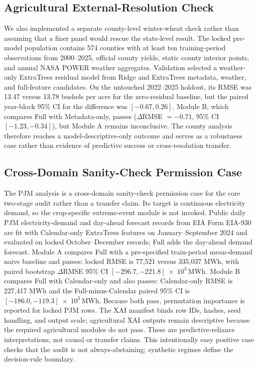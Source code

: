 \documentclass[conference]{IEEEtran}
\begin{document}
\subsection{Agricultural External-Resolution Check}
We also implemented a separate county-level winter-wheat check rather than
assuming that a finer panel would rescue the state-level result. The locked
pre-model population contains 574 counties with at least ten training-period
observations from 2000--2025, official county yields, static county interior
points, and annual NASA POWER weather aggregates. Validation selected a
weather-only ExtraTrees residual model from Ridge and ExtraTrees metadata,
weather, and full-feature candidates. On the untouched 2022--2025 holdout, its
RMSE was 13.47 versus 13.78 bushels per acre for the zero-residual baseline, but
the paired year-block 95\% CI for the difference was $[-0.67,0.26]$. Module B,
which compares Full with Metadata-only, passes ($\Delta$RMSE $=-0.71$, 95\% CI
$[-1.23,-0.34]$), but Module A remains inconclusive. The county analysis therefore
reaches a model-descriptive-only outcome and serves as a robustness case rather
than evidence of predictive success or cross-resolution transfer.

\subsection{Cross-Domain Sanity-Check Permission Case}
The PJM analysis is a cross-domain sanity-check permission case for the core
two-stage audit rather than a transfer claim. Its target is continuous electricity
demand, so the crop-specific extreme-event module is not invoked. Public daily PJM
electricity-demand and day-ahead forecast records from EIA Form EIA-930
\cite{EIA930} are fit with Calendar-only ExtraTrees features on
January--September 2024 and evaluated on locked October--December records; Full
adds the day-ahead demand forecast. Module A compares Full with a pre-specified
train-period mean-demand naive baseline and passes: locked RMSE is 77,521 versus
335,037 MWh, with paired bootstrap $\Delta$RMSE 95\% CI
$[-296.7, -221.8]\;\times\;10^3\,\mathrm{MWh}$. Module B compares Full with Calendar-only and
also passes: Calendar-only RMSE is 227,417 MWh and the Full-minus-Calendar paired
95\% CI is $[-186.0, -119.3]\;\times\;10^3\,\mathrm{MWh}$. Because both pass, permutation
importance is reported for locked PJM rows. The XAI manifest binds row IDs,
hashes, seed handling, and output scale; agricultural XAI outputs remain
descriptive because the required agricultural modules do not pass. These are predictive-reliance
interpretations, not causal or transfer claims. This intentionally easy positive
case checks that the audit is not always-abstaining; synthetic regimes define the
decision-rule boundary.
\end{document}
